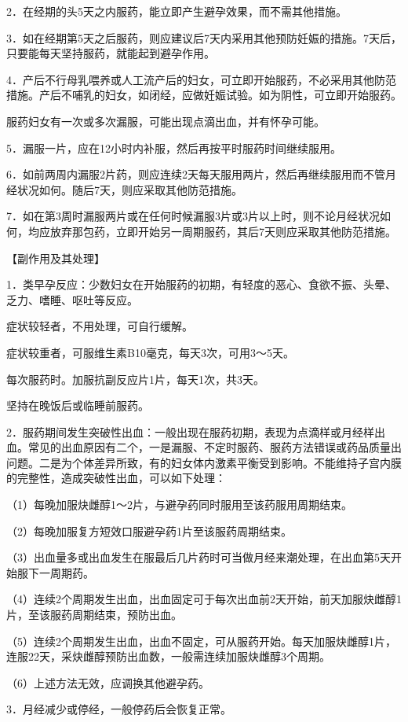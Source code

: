 \documentclass[12pt,UTF8,openany]{ctexbook}
\begin{document}
2．在经期的头5天之内服药，能立即产生避孕效果，而不需其他措施。

3．如在经期第5天之后服药，则应建议后7天内采用其他预防妊娠的措施。7天后，只要能每天坚持服药，就能起到避孕作用。

4．产后不行母乳喂养或人工流产后的妇女，可立即开始服药，不必采用其他防范措施。产后不哺乳的妇女，如闭经，应做妊娠试验。如为阴性，可立即开始服药。

服药妇女有一次或多次漏服，可能出现点滴出血，并有怀孕可能。

5．漏服一片，应在12小时内补服，然后再按平时服药时间继续服用。

6．如前两周内漏服2片药，则应连续2天每天服用两片，然后再继续服用而不管月经状况如何。随后7天，则应采取其他防范措施。

7．如在第3周时漏服两片或在任何时候漏服3片或3片以上时，则不论月经状况如何，均应放弃那包药，立即开始另一周期服药，其后7天则应采取其他防范措施。

【副作用及其处理】

1．类早孕反应：少数妇女在开始服药的初期，有轻度的恶心、食欲不振、头晕、乏力、嗜睡、呕吐等反应。

症状较轻者，不用处理，可自行缓解。

症状较重者，可服维生素B10毫克，每天3次，可用3～5天。

每次服药时。加服抗副反应片1片，每天1次，共3天。

坚持在晚饭后或临睡前服药。

2．服药期间发生突破性出血：一般出现在服药初期，表现为点滴样或月经样出血。常见的出血原因有二个，一是漏服、不定时服药、服药方法错误或药品质量出问题。二是为个体差异所致，有的妇女体内激素平衡受到影响。不能维持子宫内膜的完整性，造成突破性出血，可以如下处理：

（1）每晚加服炔雌醇1～2片，与避孕药同时服用至该药服用周期结束。

（2）每晚加服复方短效口服避孕药1片至该服药周期结束。

（3）出血量多或出血发生在服最后几片药时可当做月经来潮处理，在出血第5天开始服下一周期药。

（4）连续2个周期发生出血，出血固定可于每次出血前2天开始，前天加服炔雌醇1片，至该服药周期结束，预防出血。

（5）连续2个周期发生出血，出血不固定，可从服药开始。每天加服炔雌醇1片，连服22天，采炔雌醇预防出血数，一般需连续加服炔雌醇3个周期。

（6）上述方法无效，应调换其他避孕药。

3．月经减少或停经，一般停药后会恢复正常。
\end{document}

